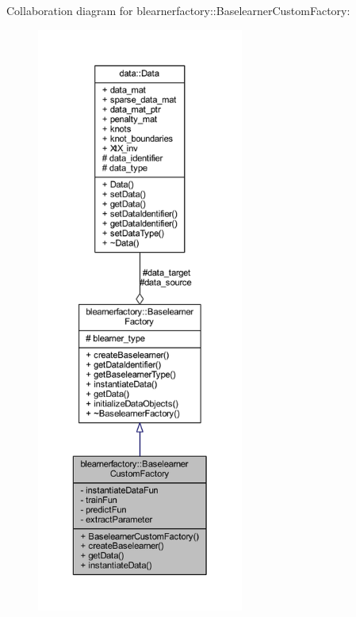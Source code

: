 Collaboration diagram for blearnerfactory\+:\+:Baselearner\+Custom\+Factory\+:\nopagebreak
\begin{figure}[H]
\begin{center}
\leavevmode
\includegraphics[height=550pt]{classblearnerfactory_1_1_baselearner_custom_factory__coll__graph}
\end{center}
\end{figure}
